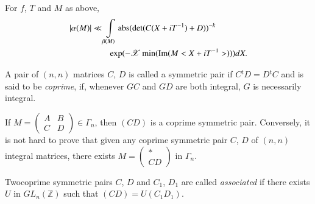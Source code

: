 \begin{sublemma}\label{c1:lem-1.4.4}
For $f$, $T$ and $M$ as above,
\begin{align*}
|\alpha(M)|&\ll
\int\limits_{\beta(M)}\operatorname{abs}(\det(C(X+iT^{-1})+D))^{-k}\\
&\qquad\exp(-\mathscr{X}\min(\operatorname{Im}(M<X+iT^{-1}>)))dX. 
\end{align*}
\end{sublemma}

\begin{defi*}
A pair of $(n,n)$ matrices $C$, $D$ is called a symmetric pair if
$C{}^{t}D=D{}^{t}C$ and is said to be {\em coprime}, if, whenever $GC$
and $GD$ are both integral, $G$ is necessarily integral.
\end{defi*}

If $M=\left(\begin{smallmatrix} A & B\\ C & D
\end{smallmatrix}\right)\in \Gamma_{n}$, then $(CD)$ is a coprime
symmetric pair. Conversely, it is not hard to prove that given any
coprime symmetric pair $C$, $D$ of $(n,n)$ integral matrices, there
exists $M=\left(\begin{smallmatrix} \ast\\ CD
\end{smallmatrix}\right)$ in $\Gamma_{n}$.

\begin{defi*}
Two\pageoriginale coprime symmetric pairs $C$, $D$ and $C_{1}$,
$D_{1}$ are called {\em associated} if there exists $U$ in
$GL_{n}(\mathbb{Z})$ such that $(CD)=U(C_{1}D_{1})$.
\end{defi*}

